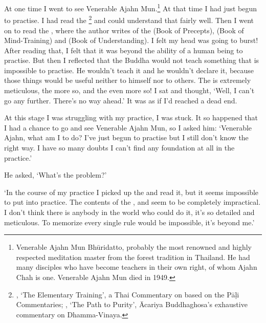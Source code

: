 At one time I went to see Venerable Ajahn Mun.\footnote{Venerable Ajahn Mun Bh\=uridatto, probably the most renowned and highly respected meditation master from the forest tradition in Thailand. He had many disciples who have become teachers in their own right, of whom Ajahn Chah is one. Venerable Ajahn Mun died in 1949.} At that time I had just begun to practise. I had read the \footnote{, `The Elementary Training', a Thai Commentary on  based on the P\=a\d{l}i Commentaries; , `The Path to Purity', \=Acariya Buddhaghosa's exhaustive commentary on Dhamma-Vinaya.} and could understand that fairly well. Then I went on to read the , where the author writes of the  (Book of Precepts),  (Book of Mind-Training) and  (Book of Understanding). I felt my head was going to burst! After reading that, I felt that it was beyond the ability of a human being to practise. But then I reflected that the Buddha would not teach something that is impossible to practise. He wouldn't teach it and he wouldn't declare it, because those things would be useful neither to himself nor to others. The  is extremely meticulous, the  more so, and the  even more so! I sat and thought, `Well, I can't go any further. There's no way ahead.' It was as if I'd reached a dead end. 

At this stage I was struggling with my practice, I was stuck. It so happened that I had a chance to go and see Venerable Ajahn Mun, so I asked him: `Venerable Ajahn, what am I to do? I've just begun to practise but I still don't know the right way. I have so many doubts I can't find any foundation at all in the practice.' 

He asked, `What's the problem?' 

`In the course of my practice I picked up the  and read it, but it seems impossible to put into practice. The contents of the ,  and  seem to be completely impractical. I don't think there is anybody in the world who could do it, it's so detailed and meticulous. To memorize every single rule would be impossible, it's beyond me.' 

